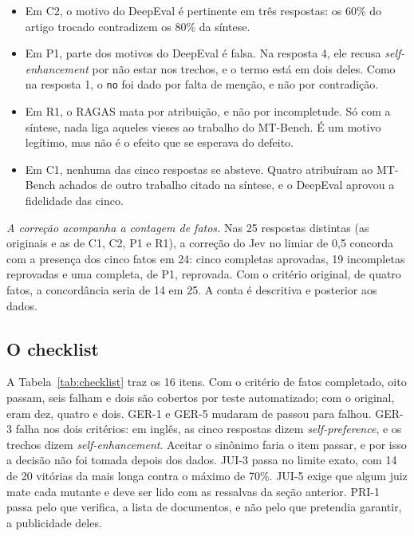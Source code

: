 \documentclass[12pt]{article}
\newcommand{\code}[1]{\texttt{\small #1}}
\begin{document}
\begin{itemize}
\item Em C2, o motivo do DeepEval é pertinente em três respostas: os 60\% do artigo
trocado contradizem os 80\% da síntese.
\item Em P1, parte dos motivos do DeepEval é falsa. Na resposta 4, ele recusa
\emph{self-enhancement} por não estar nos trechos, e o termo está em dois deles. Como na
resposta 1, o \code{no} foi dado por falta de menção, e não por contradição.
\item Em R1, o RAGAS mata por atribuição, e não por incompletude. Só com a síntese,
nada liga aqueles vieses ao trabalho do MT-Bench. É um motivo legítimo, mas não é o
efeito que se esperava do defeito.
\item Em C1, nenhuma das cinco respostas se absteve. Quatro atribuíram ao MT-Bench
achados de outro trabalho citado na síntese, e o DeepEval aprovou a fidelidade das
cinco.
\end{itemize}

\emph{A correção acompanha a contagem de fatos.} Nas 25 respostas distintas (as
originais e as de C1, C2, P1 e R1), a correção do Jev no limiar de 0,5 concorda com
a presença dos cinco fatos em 24: cinco completas aprovadas, 19 incompletas
reprovadas e uma completa, de P1, reprovada. Com o critério original, de quatro
fatos, a concordância seria de 14 em 25. A conta é descritiva e posterior aos dados.

\subsection{O checklist}

A Tabela~\ref{tab:checklist} traz os 16 itens. Com o critério de fatos completado,
oito passam, seis falham e dois são cobertos por teste automatizado; com o original,
eram dez, quatro e dois. GER-1 e GER-5 mudaram de passou para falhou. GER-3 falha nos
dois critérios: em inglês, as cinco respostas dizem \emph{self-preference}, e os
trechos dizem \emph{self-enhancement}. Aceitar o sinônimo faria o item passar, e por
isso a decisão não foi tomada depois dos dados. JUI-3 passa no limite exato, com 14 de
20 vitórias da mais longa contra o máximo de 70\%. JUI-5 exige que algum juiz mate
cada mutante e deve ser lido com as ressalvas da seção anterior. PRI-1 passa pelo que
verifica, a lista de documentos, e não pelo que pretendia garantir, a publicidade deles.
\end{document}
